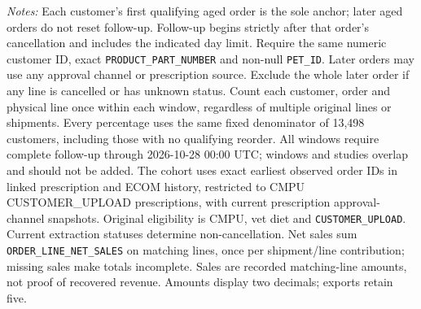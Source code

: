 \begin{table}[!htbp]
\begin{minipage}{\linewidth}
\footnotesize
\textit{Notes:} Each customer's first qualifying aged order is the sole anchor;
later aged orders do not reset follow-up. Follow-up begins strictly after that
order's cancellation and includes the indicated day limit. Require the same
numeric customer ID, exact \texttt{PRODUCT\_PART\_NUMBER} and non-null
\texttt{PET\_ID}. Later orders may use any approval channel or prescription
source. Exclude the whole later order if any line is cancelled or has unknown
status. Count each customer, order and physical line once within each window,
regardless of multiple original lines or shipments. Every percentage uses the
same fixed denominator of 13,498 customers, including those with no
qualifying reorder. All windows require complete follow-up through
2026-10-28 00:00 UTC; windows and studies overlap and should not be added.
The cohort uses exact earliest observed order IDs in linked prescription and
ECOM history, restricted to CMPU CUSTOMER\_UPLOAD prescriptions, with current
prescription approval-channel snapshots. Original eligibility is CMPU,
vet diet and \texttt{CUSTOMER\_UPLOAD}. Current extraction statuses determine
non-cancellation. Net sales sum \texttt{ORDER\_LINE\_NET\_SALES} on matching
lines, once per shipment/line contribution; missing sales make totals incomplete.
Sales are recorded matching-line amounts, not proof of recovered revenue.
Amounts display two decimals; exports retain five.
\end{minipage}
\end{table}
